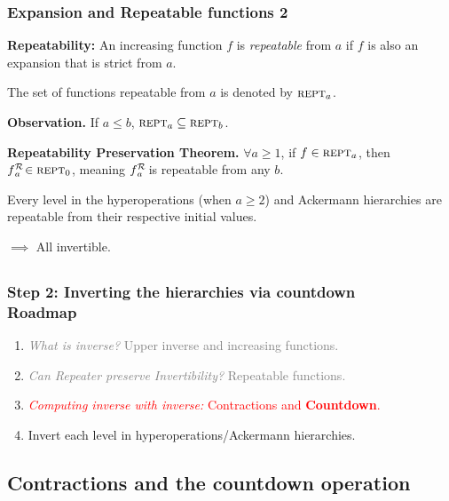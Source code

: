 \begin{frame}
\frametitle{Expansion and Repeatable functions 2}
\label{frame:repeatable2}
\textbf{Repeatability:} An increasing function $f$ is \emph{repeatable} from $a$ if $f$ is also an expansion that is strict from $a$.

\smallskip

The set of functions repeatable from $a$ is denoted by $\text{\scshape{rept}}_a$.

\smallskip

\textbf{Observation.} If $a\le b$, $\text{\scshape{rept}}_a\subseteq \text{\scshape{rept}}_b$.

\bigskip

\textbf{Repeatability Preservation Theorem.} $\forall a\ge 1$, if $f \in \text{\scshape{rept}}_a$, then $\rf{f}{a} \in \repeatable_0$, meaning $\rf{f}{a}$ is repeatable from any $b$.

\bigskip

Every level in the hyperoperations (when $a\ge 2$) and Ackermann hierarchies are repeatable from their respective initial values.

$\implies$ All invertible.

\end{frame}


\subsection*{}
\begin{frame}
\frametitle{Step 2: Inverting the hierarchies via countdown\\ Roadmap}
\begin{enumerate}\itemsep2em
	\item \textcolor<1-2>{gray}{\emph{What is inverse?} Upper inverse and increasing functions.}
	\item \textcolor<1-2>{gray}{\emph{Can Repeater preserve Invertibility?} Repeatable functions.}
	\item \textcolor<2>{red}{\emph{Computing inverse with inverse:} Contractions and \textbf{Countdown}.}
	\item Invert each level in hyperoperations/Ackermann hierarchies.
\end{enumerate}
\end{frame}


\subsection{Contractions and the countdown operation}


